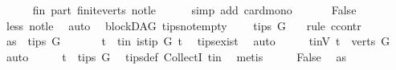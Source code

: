 \begin{isabellebody}
\ \ \ \ \isamarkupfalse%
\ fin\ part\ finite{\isacharunderscore}{\kern0pt}verts\ not{\isacharunderscore}{\kern0pt}le\isanewline
\ \ \ \ \isamarkupfalse%
\ {\isacharparenleft}{\kern0pt}simp\ add{\isacharcolon}{\kern0pt}\ card{\isacharunderscore}{\kern0pt}mono{\isacharparenright}{\kern0pt}\ \isanewline
\ \ \isamarkupfalse%
\ \isamarkupfalse%
\ False\isanewline
\ \ \ \ \isamarkupfalse%
\ less\ not{\isacharunderscore}{\kern0pt}le\ \isamarkupfalse%
\ auto\isanewline
{}\isamarkupfalse%
%
\endisatagproof
{\isafoldproof}%
%
\isadelimproof
\isanewline
%
\endisadelimproof
\isanewline
{}\isamarkupfalse%
\ {\isacharparenleft}{\kern0pt}\ blockDAG{\isacharparenright}{\kern0pt}\ tips{\isacharunderscore}{\kern0pt}not{\isacharunderscore}{\kern0pt}empty{\isacharcolon}{\kern0pt}\ \isanewline
\ \ \ {\isachardoublequoteopen}tips\ G\ {\isasymnoteq}\ {\isacharbraceleft}{\kern0pt}{\isacharbraceright}{\kern0pt}{\isachardoublequoteclose}\ \isanewline
%
\isadelimproof
%
\endisadelimproof
%
\isatagproof
{}\isamarkupfalse%
{\isacharparenleft}{\kern0pt}rule\ ccontr{\isacharparenright}{\kern0pt}\isanewline
\ \ \isamarkupfalse%
\ as{}{\isacharcolon}{\kern0pt}\ {\isachardoublequoteopen}{\isasymnot}\ tips\ G\ {\isasymnoteq}\ {\isacharbraceleft}{\kern0pt}{\isacharbraceright}{\kern0pt}{\isachardoublequoteclose}\ \isanewline
\ \ \isamarkupfalse%
\ t\ \ t{\isacharunderscore}{\kern0pt}in{\isacharcolon}{\kern0pt}\ {\isachardoublequoteopen}is{\isacharunderscore}{\kern0pt}tip\ G\ t{\isachardoublequoteclose}\ \isamarkupfalse%
\ tips{\isacharunderscore}{\kern0pt}exist\ \isamarkupfalse%
\ auto\isanewline
\ \ \isamarkupfalse%
\ \isamarkupfalse%
\ t{\isacharunderscore}{\kern0pt}inV{\isacharcolon}{\kern0pt}\ {\isachardoublequoteopen}t\ {\isasymin}\ verts\ G{\isachardoublequoteclose}\ \isamarkupfalse%
\ auto\isanewline
\ \ \isamarkupfalse%
\ \isamarkupfalse%
\ {\isachardoublequoteopen}t\ {\isasymin}\ tips\ G{\isachardoublequoteclose}\ \isamarkupfalse%
\ tips{\isacharunderscore}{\kern0pt}def\ CollectI\ t{\isacharunderscore}{\kern0pt}in\ \isamarkupfalse%
\ metis\isanewline
\ \ \isamarkupfalse%
\ \isamarkupfalse%
\ False\ \isamarkupfalse%
\ as{}\ \isamarkupfalse%

\end{isabellebody}
